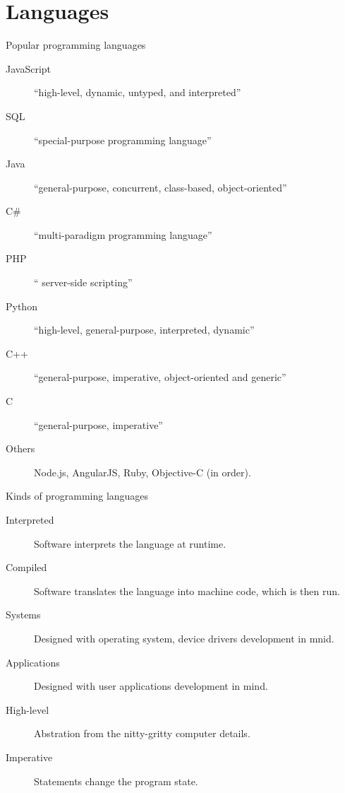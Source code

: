 
\section{Languages}

\begin{frame}{Popular programming languages}
  \begin{description}
    \item[JavaScript] ``high-level, dynamic, untyped, and interpreted''
    \item[SQL] ``special-purpose programming language''
    \item[Java] ``general-purpose, concurrent, class-based, object-oriented''
    \item[C\#] ``multi-paradigm programming language''
    \item[PHP] `` server-side scripting''
    \item[Python] ``high-level, general-purpose, interpreted, dynamic''
    \item[C++] ``general-purpose, imperative, object-oriented and generic''
    \item[C] ``general-purpose, imperative''
    \item[Others] Node.js, AngularJS, Ruby, Objective-C (in order).
  \end{description}
\end{frame}


\begin{frame}{Kinds of programming languages}
  \begin{description}
    \item[Interpreted] Software interprets the language at runtime. 
    \item[Compiled] Software translates the language into machine code, which is then run.\\[1cm] 
    \item[Systems] Designed with operating system, device drivers development in mnid.
    \item[Applications] Designed with user applications development in mind.\\[1cm]
    \item[High-level] Abstration from the nitty-gritty computer details.
    \item[Imperative] Statements change the program state.
  \end{description}
\end{frame}

